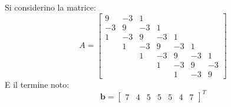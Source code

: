 Si considerino la matrice:
\begin{equation*}
    A = \begin{bmatrix}
        9 & -3 & 1 & & & & \\
        -3 & 9 & -3 & 1 & & & \\
        1 & -3 & 9 & -3 & 1 & & \\
        & 1 & -3 & 9 & -3 & 1 & \\
        && 1 & -3 & 9 & -3 & 1 \\
        &&& 1 & -3 & 9 & -3 \\
        &&&& 1 & -3 & 9 
    \end{bmatrix}
\end{equation*}
E il termine noto:
\begin{equation*}
    \mathbf{b} = \begin{bmatrix}
        7 & 4 & 5 & 5 & 5 & 4 & 7
    \end{bmatrix}^{T}
\end{equation*}
